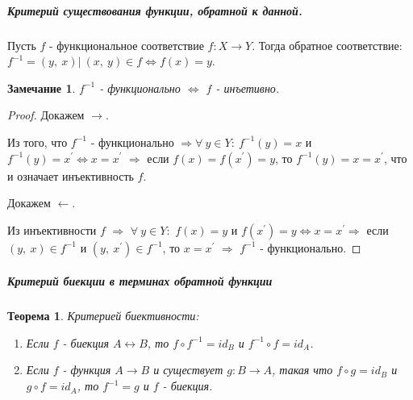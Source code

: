 \documentclass[a4paper,12pt]{article}
\newtheorem*{theorem}{Теорема}
\newtheorem*{Note}{Замечание}
\newcommand{\p}{^{\prime}}
\begin{document}
        \subparagraph{Критерий существования функции, обратной к данной.}
        Пусть $f$ - функциональное соответствие $f:X \rightarrow Y$. Тогда обратное соответствие: $f^{-1} = {(y,\ x)|\ (x,\ y) \in f \Leftrightarrow f(x) = y}$.

        \begin{Note} $f^{-1}$ - функционально $\Leftrightarrow$ $f$ - инъетивно.
        \end{Note}

        \begin{proof}

        Докажем $\rightarrow$.

        Из того, что $f^{-1}$ - функционально $\Rightarrow \forall\ y \in Y:\ f^{-1}(y) = x$ и $f^{-1}(y) = x\p \Leftrightarrow x = x\p$ $\Rightarrow$ если $f(x) = f(x\p) = y$, то $f^{-1}(y) = x = x\p$, что и означает инъективность $f$.

        Докажем $\leftarrow$.

        Из инъективности $f$ $\Rightarrow$ $\forall\ y \in Y:$  $f(x) = y$ и $f(x\p) = y \Leftrightarrow x = x\p \Rightarrow$ если $(y,\ x) \in f^{-1}$ и $(y,\ x\p) \in f^{-1}$, то $x = x\p$ $\Rightarrow$ $f^{-1}$ - функционально.
        \end{proof}

        \subparagraph{Критерий биекции в терминах обратной функции}
        \begin{theorem} Критерией биективности:
            \begin{enumerate}
                \item Если $f$ - биекция $A \leftrightarrow B$,
                то $f \circ f^{-1} = id_B$ и
                            $f^{-1} \circ f = id_A$.
                \item Если $f$ - функция $A \rightarrow B$ и существует $g: B \rightarrow A$, такая что $f \circ g = id_B$ и $g \circ f = id_A$, то $f^{-1} = g$ и $f$ - биекция.
            \end{enumerate}
        \end{theorem}
\end{document}
